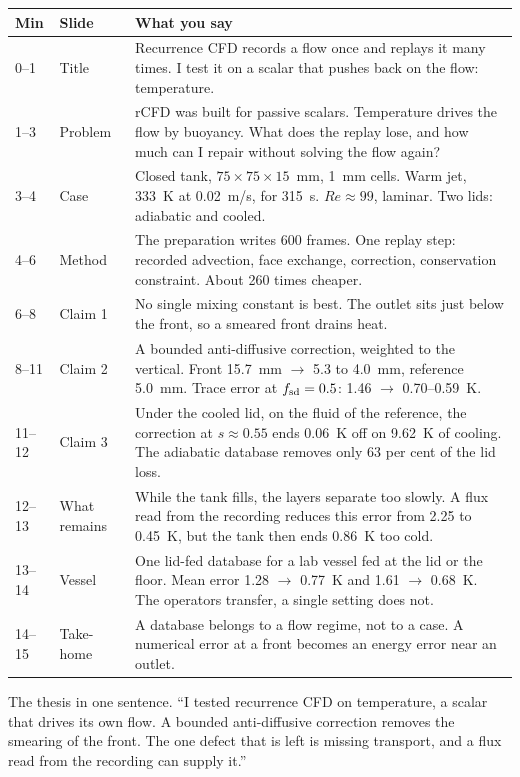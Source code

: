 \begin{center}
\begin{tabularx}{\linewidth}{@{}l l X@{}}
\toprule
Min & Slide & What you say \\
\midrule
0--1 & Title & Recurrence CFD records a flow once and replays it many times. I test it on a scalar
  that pushes back on the flow: temperature. \\
1--3 & Problem & rCFD was built for passive scalars. Temperature drives the flow by buoyancy. What
  does the replay lose, and how much can I repair without solving the flow again? \\
3--4 & Case & Closed tank, $75\times75\times15$~mm, 1~mm cells. Warm jet, 333~K at 0.02~m/s, for
  315~s. $Re \approx 99$, laminar. Two lids: adiabatic and cooled. \\
4--6 & Method & The preparation writes 600 frames. One replay step: recorded advection, face
  exchange, correction, conservation constraint. About 260 times cheaper. \\
6--8 & Claim 1 & No single mixing constant is best. The outlet sits just below the front, so a
  smeared front drains heat. \\
8--11 & Claim 2 & A bounded anti-diffusive correction, weighted to the vertical. Front 15.7~mm
  $\to$ 5.3 to 4.0~mm, reference 5.0~mm. Trace error at $f_{\mathrm{sd}}=0.5$: 1.46 $\to$ 0.70--0.59~K. \\
11--12 & Claim 3 & Under the cooled lid, on the fluid of the reference, the correction at
  $s \approx 0.55$ ends 0.06~K off on 9.62~K of cooling. The adiabatic database removes only
  63 per cent of the lid loss. \\
12--13 & What remains & While the tank fills, the layers separate too slowly. A flux read from the
  recording reduces this error from 2.25 to 0.45~K, but the tank then ends 0.86~K too cold. \\
13--14 & Vessel & One lid-fed database for a lab vessel fed at the lid or the floor. Mean error
  1.28 $\to$ 0.77~K and 1.61 $\to$ 0.68~K. The operators transfer, a single setting does not. \\
14--15 & Take-home & A database belongs to a flow regime, not to a case. A numerical error at a
  front becomes an energy error near an outlet. \\
\bottomrule
\end{tabularx}
\end{center}

\begin{tipbox}
\textsf{The thesis in one sentence.} ``I tested recurrence CFD on temperature, a scalar that drives
its own flow. A bounded anti-diffusive correction removes the smearing of the front. The one defect
that is left is missing transport, and a flux read from the recording can supply it.''
\end{tipbox}

